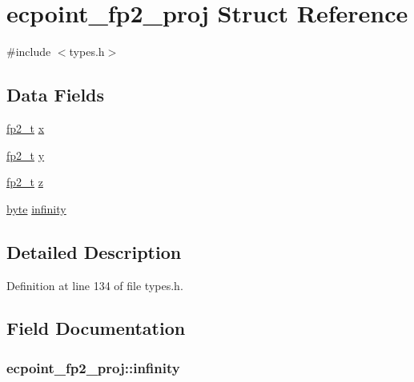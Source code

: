 \hypertarget{structecpoint__fp2__proj}{\section{ecpoint\-\_\-fp2\-\_\-proj Struct Reference}
\label{structecpoint__fp2__proj}
}


{\ttfamily \#include $<$types.\-h$>$}

\subsection*{Data Fields}
\begin{DoxyCompactItemize}
\item 
\hyperlink{types_8h_a8d7302536c911390e7ed2a57092e6bf0}{fp2\-\_\-t} \hyperlink{structecpoint__fp2__proj_a4707f5af2a353b0e19f633387295df0f}{x}
\item 
\hyperlink{types_8h_a8d7302536c911390e7ed2a57092e6bf0}{fp2\-\_\-t} \hyperlink{structecpoint__fp2__proj_a8bcf77075820297a0fa4d279b4c6ac2c}{y}
\item 
\hyperlink{types_8h_a8d7302536c911390e7ed2a57092e6bf0}{fp2\-\_\-t} \hyperlink{structecpoint__fp2__proj_abcf8159983dfa823b8db342f5fca2d4d}{z}
\item 
\hyperlink{types_8h_a0c8186d9b9b7880309c27230bbb5e69d}{byte} \hyperlink{structecpoint__fp2__proj_ae848a5b9e27013f8490e6f73e489e319}{infinity}
\end{DoxyCompactItemize}


\subsection{Detailed Description}


Definition at line 134 of file types.\-h.



\subsection{Field Documentation}
\hypertarget{structecpoint__fp2__proj_ae848a5b9e27013f8490e6f73e489e319}{
\subsubsection[{infinity}]{ ecpoint\-\_\-fp2\-\_\-proj\-::infinity}}\label{structecpoint__fp2__proj_ae848a5b9e27013f8490e6f73e489e319}



